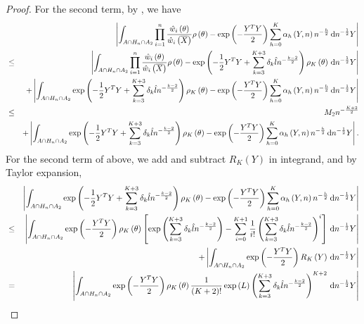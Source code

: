 \begin{proof}
For the second term, by , we
have 
\begin{eqnarray*}
 &  & \left|\int_{A\cap H_{n}\cap A_{2}}\prod_{i=1}^{n}\frac{\hat{w}_{i}\left(\theta\right)}{\hat{w}_{i}\left(\overline{X}\right)}\rho\left(\theta\right)-\exp\left(-\frac{Y^{T}Y}{2}\right)\sum_{h=0}^{K}\alpha_{h}\left(Y,n\right)n^{-\frac{h}{2}}\,\mathrm{d} n^{-\frac{1}{2}}Y\right|\\
 & \le & \left|\int_{A\cap H_{n}\cap A_{2}}\prod_{i=1}^{n}\frac{\hat{w}_{i}\left(\theta\right)}{\hat{w}_{i}\left(\overline{X}\right)}\rho\left(\theta\right)-\exp\left(-\frac{1}{2}Y^{T}Y+\sum_{k=3}^{K+3}\delta_{k}\hat{l}n^{-\frac{k-2}{2}}\right)\rho_{K}\left(\theta\right)\,\mathrm{d} n^{-\frac{1}{2}}Y\right|\\
 &  & +\left|\int_{A\cap H_{n}\cap A_{2}}\exp\left(-\frac{1}{2}Y^{T}Y+\sum_{k=3}^{K+3}\delta_{k}\hat{l}n^{-\frac{k-2}{2}}\right)\rho_{K}\left(\theta\right)-\exp\left(-\frac{Y^{T}Y}{2}\right)\sum_{h=0}^{K}\alpha_{h}\left(Y,n\right)n^{-\frac{h}{2}}\,\mathrm{d} n^{-\frac{1}{2}}Y\right|\\
 & \le & M_{2}n^{-\frac{K+2}{2}}\\
 &  & +\left|\int_{A\cap H_{n}\cap A_{2}}\exp\left(-\frac{1}{2}Y^{T}Y+\sum_{k=3}^{K+3}\delta_{k}\hat{l}n^{-\frac{k-2}{2}}\right)\rho_{K}\left(\theta\right)-\exp\left(-\frac{Y^{T}Y}{2}\right)\sum_{h=0}^{K}\alpha_{h}\left(Y,n\right)n^{-\frac{h}{2}}\,\mathrm{d} n^{-\frac{1}{2}}Y\right|.
\end{eqnarray*}
For the second term of above, we add and subtract $R_{K}\left(Y\right)$
in integrand, and by Taylor expansion, 
\begin{eqnarray*}
 &  & \left|\int_{A\cap H_{n}\cap A_{2}}\exp\left(-\frac{1}{2}Y^{T}Y+\sum_{k=3}^{K+3}\delta_{k}\hat{l}n^{-\frac{k-2}{2}}\right)\rho_{K}\left(\theta\right)-\exp\left(-\frac{Y^{T}Y}{2}\right)\sum_{h=0}^{K}\alpha_{h}\left(Y,n\right)n^{-\frac{h}{2}}\diff n^{-\frac{1}{2}}Y\right|\\
 & \le & \left|\int_{A\cap H_{n}\cap A_{2}}\exp\left(-\frac{Y^{T}Y}{2}\right)\rho_{K}\left(\theta\right)\left[\exp\left(\sum_{k=3}^{K+3}\delta_{k}\hat{l}n^{-\frac{k-2}{2}}\right)-\sum_{i=0}^{K+1}\frac{1}{i!}\left(\sum_{k=3}^{K+3}\delta_{k}\hat{l}n^{-\frac{k-2}{2}}\right)^{i}\right]\diff n^{-\frac{1}{2}}Y\right|\\
 &  & +\left|\int_{A\cap H_{n}\cap A_{2}}\exp\left(-\frac{Y^{T}Y}{2}\right)R_{K}\left(Y\right)\diff n^{-\frac{1}{2}}Y\right|\\
 & = & \left|\int_{A\cap H_{n}\cap A_{2}}\exp\left(-\frac{Y^{T}Y}{2}\right)\rho_{K}\left(\theta\right)\frac{1}{\left(K+2\right)!}\exp\left(L\right)\left(\sum_{k=3}^{K+3}\delta_{k}\hat{l}n^{-\frac{k-2}{2}}\right)^{K+2}\diff n^{-\frac{1}{2}}Y\right|\\

\end{eqnarray*}
\end{proof}
